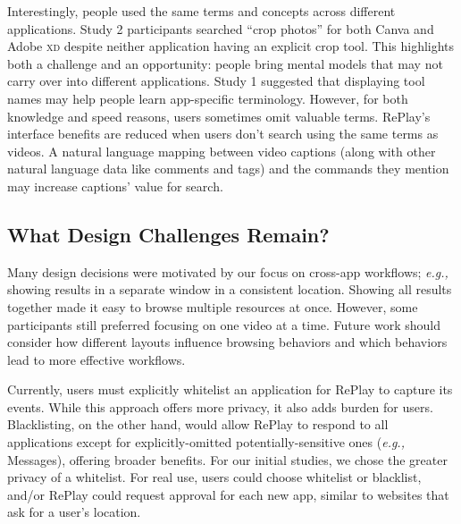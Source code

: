 Interestingly, people used the same terms and concepts across different applications. Study 2 participants searched ``crop photos'' for both Canva and Adobe \textsc{xd} despite neither application having an explicit crop tool. This highlights both a challenge and an opportunity: people bring mental models that may not carry over into different applications. Study 1 suggested that displaying tool names may help people learn app-specific terminology. However, for both knowledge and speed reasons, users sometimes omit valuable terms. RePlay's interface benefits are reduced when users don't search using the same terms as videos. A natural language mapping \cite{Adar2014} between video captions (along with other natural language data like comments and tags) and the commands they mention may increase captions' value for search.

\subsection{What Design Challenges Remain?}
Many design decisions were motivated by our focus on cross-app workflows; \textit{e.g.,} showing results in a separate window in a consistent location. Showing all results together made it easy to browse multiple resources at once. However, some participants still preferred focusing on one video at a time. Future work should consider how different layouts influence browsing behaviors and which behaviors lead to more effective workflows.

Currently, users must explicitly whitelist an application for RePlay to capture its events. While this approach offers more privacy, it also adds burden for users.  Blacklisting, on the other hand, would allow RePlay to respond to all applications except for explicitly-omitted potentially-sensitive ones (\textit{e.g.,} Messages), offering broader benefits. For our initial studies, we chose the greater privacy of a whitelist. For real use, users could choose whitelist or blacklist, and/or RePlay could request approval for each new app, similar to websites that ask for a user's location.

